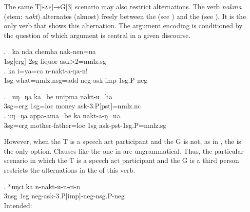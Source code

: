 The same T[\textsc{sap}]→G[3] scenario may also restrict alternations.  The verb \emph{nakma} (stem: \emph{nakt})  alternates (almost) freely between the  (see \Next) and the  (see \NNext). It is the only verb that shows this alternation. The argument encoding is conditioned by the question of which argument is central in a given discourse.

	 \ex. \ag.  ka nda chemha nak-nen=na\\
	{\sc 1sg[erg]} 	 {\sc 2sg}  liquor ask{>2=nmlz.sg}	\\
	 \bg. ka i=ya=ca n-nakt-a-ŋa-n!\\ 
	{\sc 1sg}  what{\sc =nmlz.nsg=add} {\sc neg-}ask{\sc -imp-1sg.P-neg}		\\ 
	    
	
\ex. \ag. uŋ=ŋa ka=be unipma nakt-u=ha\\
		{\sc 3sg=erg} {\sc 1sg=loc}  money   ask{\sc -3.P[pst]=nmlz.nc}	\\
 	\bg. uŋ=ŋa appa-ama=be ka nakt-a-ŋ=na\\
	{\sc 3sg=erg} mother-father{\sc =loc}  {\sc 1sg}	ask{\sc -pst-1sg.P=nmlz.sg}	\\

However, when the T is a speech act participant and the G is not, as in \Last[b], the  is the only option. Clauses like the one in \Next are ungrammatical. Thus, the particular scenario in which the T is a speech act participant and the G is a third person restricts the alternations in the  of this verb.

\exg. *uŋci ka n-nakt-u-n-ci-n\\
	{\sc 3nsg} {\sc 1sg} {\sc neg-}ask{\sc -3.P[imp]-neg-nsg.P-neg}\\
	Intended:   


